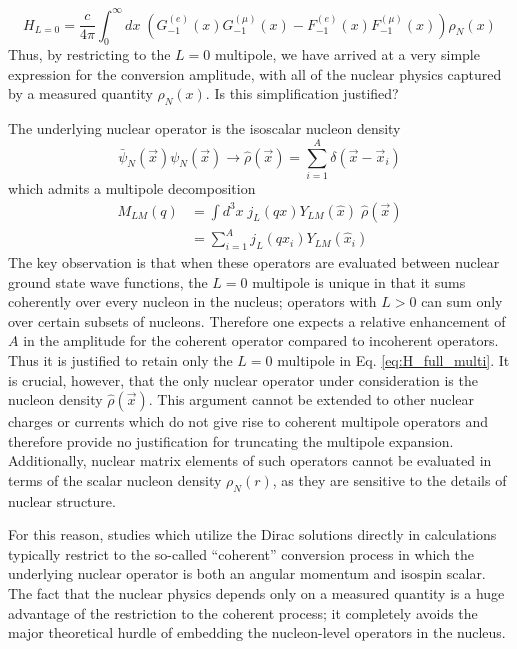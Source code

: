 \documentclass{book}[12pt]
\begin{document}
\begin{equation}
H_{L=0}=\frac{c}{4\pi}\int_0^{\infty}dx\;\left(G_{-1}^{(e)}(x)G_{-1}^{(\mu)}(x)-F_{-1}^{(e)}(x)F_{-1}^{(\mu)}(x)\right)\rho_N(x)
\end{equation}
Thus, by restricting to the $L=0$ multipole, we have arrived at a very simple expression for the conversion amplitude, with all of the nuclear physics captured by a measured quantity $\rho_N(x)$. Is this simplification justified?

The underlying nuclear operator is the isoscalar nucleon density
\begin{equation}
\bar{\psi}_N(\vec{x})\psi_N(\vec{x})\rightarrow\hat{\rho}(\vec{x})=\sum_{i=1}^A\delta(\vec{x}-\vec{x}_i)
\end{equation} 
which admits a multipole decomposition
\begin{equation}
\begin{split}
M_{LM}(q)&=\int d^3x\;j_L(qx)Y_{LM}(\hat{x})\;\hat{\rho}(\vec{x})\\
&=\sum_{i=1}^Aj_L(qx_i)Y_{LM}(\hat{x}_i)
\end{split}
\end{equation}
The key observation is that when these operators are evaluated between nuclear ground state wave functions, the $L=0$ multipole is unique in that it sums coherently over every nucleon in the nucleus; operators with $L>0$ can sum only over certain subsets of nucleons. Therefore one expects a relative enhancement of $A$ in the amplitude for the coherent operator compared to incoherent operators. Thus it is justified to retain only the $L=0$ multipole in Eq. \ref{eq:H_full_multi}. It is crucial, however, that the only nuclear operator under consideration is the nucleon density $\hat{\rho}(\vec{x})$. This argument cannot be extended to other nuclear charges or currents which do not give rise to coherent multipole operators and therefore provide no justification for truncating the multipole expansion. Additionally, nuclear matrix elements of such operators cannot be evaluated in terms of the scalar nucleon density $\rho_N(r)$, as they are sensitive to the details of nuclear structure. 


For this reason, studies which utilize the Dirac solutions directly in calculations typically restrict to the so-called ``coherent'' conversion process in which the underlying nuclear operator is both an angular momentum and isospin scalar. The fact that the nuclear physics depends only on a measured quantity is a huge advantage of the restriction to the coherent process; it completely avoids the major theoretical hurdle of embedding the nucleon-level operators in the nucleus.
\end{document}
